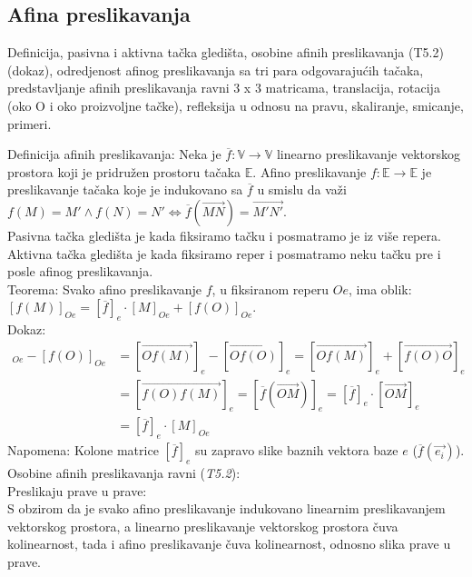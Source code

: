 \documentclass[12pt]{article}
\newcommand{\vek}[1]{\overrightarrow{#1}}
\begin{document}
\subsection{Afina preslikavanja}
Definicija, pasivna i aktivna tačka gledišta, osobine afinih
preslikavanja (T5.2) (dokaz), odredjenost afinog
preslikavanja sa tri para odgovarajućih tačaka,
predstavljanje afinih preslikavanja ravni 3 x 3 matricama,
translacija, rotacija (oko O i oko proizvoljne tačke), refleksija
u odnosu na pravu, skaliranje, smicanje, primeri.
\par

\vspace*{1cm}

Definicija afinih preslikavanja: Neka je $\overline{f}: \mathbb{V}\rightarrow\mathbb{V}$
linearno preslikavanje vektorskog prostora koji je pridružen prostoru
tačaka $\mathbb{E}$. Afino preslikavanje $f: \mathbb{E}\rightarrow\mathbb{E}$
je preslikavanje tačaka koje je indukovano sa $\overline{f}$ u smislu
da važi $f(M)=M'\land f(N)=N' \iff \overline{f}(\vek{MN})=\vek{M'N'}$.\\
Pasivna tačka gledišta je kada fiksiramo tačku i posmatramo je iz više repera.\\
Aktivna tačka gledišta je kada fiksiramo reper i posmatramo neku tačku pre i posle afinog preslikavanja.\\
Teorema: Svako afino preslikavanje $f$, u fiksiranom reperu $Oe$, ima oblik:\\
$[f(M)]_{Oe}=[\overline{f}]_{e}\cdot[M]_{Oe}+[f(O)]_{Oe}$.\\
Dokaz:
\begin{align*}
    [f(M)]_{Oe}-[f(O)]_{Oe} & =[\vek{Of(M)}]_e-[\vek{Of(O)}]_e =[\vek{Of(M)}]_e+[\vek{f(O)O}]_e                 \\
                            & =[\vek{f(O)f(M)}]_e=[\overline{f}(\vek{OM})]_e =[\overline{f}]_e\cdot[\vek{OM}]_e \\
                            & =[\overline{f}]_e\cdot[M]_{Oe}
\end{align*}
Napomena: Kolone matrice $[\overline{f}]_e$ su zapravo slike baznih vektora baze $e$ ($\overline{f}(\vek{e_i})$).\\
Osobine afinih preslikavanja ravni (\textit{T5.2}):\\
Preslikaju prave u prave:\\
S obzirom da je svako afino preslikavanje indukovano linearnim preslikavanjem
vektorskog prostora, a linearno preslikavanje vektorskog prostora
čuva kolinearnost, tada i afino preslikavanje čuva kolinearnost, odnosno slika prave u prave.\\
\end{document}
